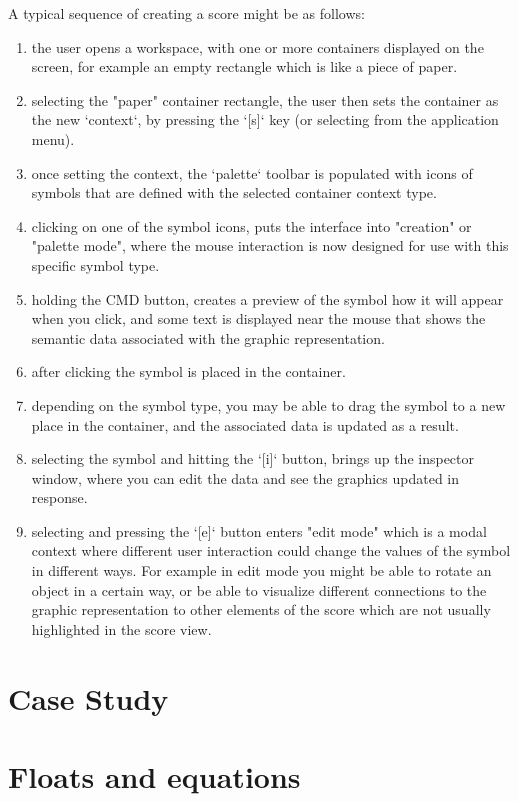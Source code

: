 \documentclass{article}
\begin{document}
A typical sequence of creating a score might be as follows:
\begin{enumerate}\itemsep0pt
\item the user opens a workspace, with one or more containers displayed on the screen, for example an empty rectangle which is like a piece of paper.
\item selecting the "paper" container rectangle, the user then sets the container as the new `context`, by pressing the `[s]` key (or selecting from the application menu).
\item once setting the context, the `palette` toolbar is populated with icons of symbols that are defined with the selected container context type.
\item clicking on one of the symbol icons, puts the interface into "creation" or "palette mode", where the mouse interaction is now designed for use with this specific symbol type.
\item holding the CMD button, creates a preview of the symbol how it will appear when you click, and some text is displayed near the mouse that shows the semantic data associated with the graphic representation.
\item after clicking the symbol is placed in the container.
\item depending on the symbol type, you may be able to drag the symbol to a new place in the container, and the associated data is updated as a result.
\item selecting the symbol and hitting the `[i]` button, brings up the inspector window, where you can edit the data and see the graphics updated in response.
\item selecting and pressing the `[e]` button enters "edit mode" which is a modal context where different user interaction could change the values of the symbol in different ways. For example in edit mode you might be able to rotate an object in a certain way, or be able to visualize different connections to the graphic representation to other elements of the score which are not usually highlighted in the score view.
\end{enumerate}





\section{Case Study}\label{sec:node_score}



\section{Floats and equations}
\end{document}
